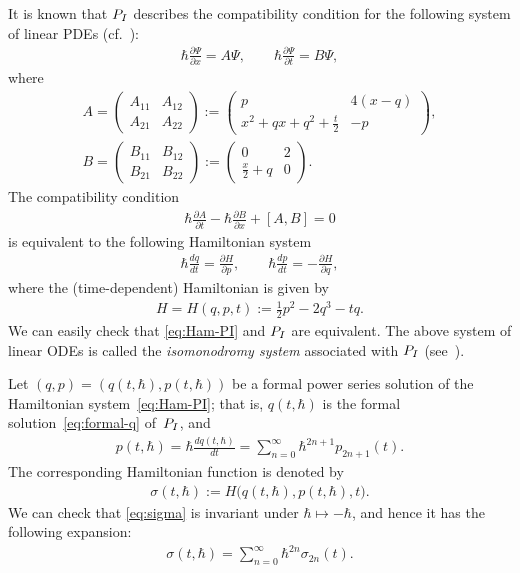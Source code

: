 \documentclass[11pt]{article}
\theoremstyle{definition}
\numberwithin{equation}{section}
\def\PI{P_{\rm I}}
\def\p{\partial}
\begin{document}
It is known that $\PI$ describes the compatibility condition
for the following system of linear PDEs (cf.~\cite[Appendix C]{JM2}):
\begin{gather} \label{eq:Lax-matrix}
\hbar \frac{\p \Psi}{\p x}  = A \Psi, \qquad
\hbar \frac{\p \Psi}{\p t}  = B \Psi,
\end{gather}
where
\begin{gather*}
A   =
\begin{pmatrix}
A_{11} & A_{12} \\
A_{21} & A_{22}
\end{pmatrix}
:=
\begin{pmatrix}
  p
&
  4(x-q)
\\
\displaystyle x^{2} + q x + q^{2} + \frac{t}{2}
&
  - p
\end{pmatrix},
\\
B  =
\begin{pmatrix}
B_{11} & B_{12} \\
B_{21} & B_{22}
\end{pmatrix}
:=
\begin{pmatrix}
 0
&
   2
\\
\displaystyle \frac{x}{2} + q
&
  0
\end{pmatrix}.
\end{gather*}
The compatibility condition
\begin{gather*}
\hbar \frac{\p A}{\p t} - \hbar \frac{\p B}{\p x} + [A,B] = 0
\end{gather*}
is equivalent to the following Hamiltonian system
\begin{gather} \label{eq:Ham-PI}
\hbar \frac{dq}{dt} = \frac{\p H}{\p p}, \qquad
\hbar \frac{dp}{dt} = - \frac{\p H}{\p q},
\end{gather}
where the (time-dependent) Hamiltonian is given by
\begin{gather*}%
H = H(q,p,t) := \frac{1}{2}p^{2} - 2 q^{3} - t q.
\end{gather*}
We can easily check that \eqref{eq:Ham-PI} and $\PI$ are equivalent.
The above system of linear ODEs
is called the {\em isomonodromy system} associated with $\PI$
(see~\cite{JMU, JM2}).

Let $(q,p) = (q(t,\hbar), p(t,\hbar))$ be a formal power series
solution of the Hamiltonian system~\eqref{eq:Ham-PI}; that is,
$q(t,\hbar)$ is the formal solution~\eqref{eq:formal-q}
of~$\PI$, and
\begin{gather*} %
p(t,\hbar) = \hbar \frac{d q(t,\hbar)}{dt} =
\sum_{n=0}^{\infty} \hbar^{2n+1} p_{2n+1}(t).
\end{gather*}
The corresponding Hamiltonian function is denoted by
\begin{gather} \label{eq:sigma}
\sigma(t,\hbar) := H\big(q(t,\hbar), p(t,\hbar), t\big).
\end{gather}
We can check that \eqref{eq:sigma}
is invariant under $\hbar \mapsto - \hbar$, and hence
it has the following expansion:
\begin{gather} \label{eq:parity-sigma}
\sigma(t,\hbar) = \sum_{n=0}^{\infty} \hbar^{2n} \sigma_{2n}(t).
\end{gather}
\end{document}
